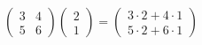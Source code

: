 \documentclass[preview]{standalone}
\begin{document}
\begin{align*}
\begin{pmatrix}3 & 4 \\ 5 & 6\end{pmatrix} \begin{pmatrix}2 \\ 1\end{pmatrix} = \begin{pmatrix}3 \cdot 2 + 4 \cdot 1 \\ 5 \cdot 2 + 6 \cdot 1\end{pmatrix}
\end{align*}
\end{document}
